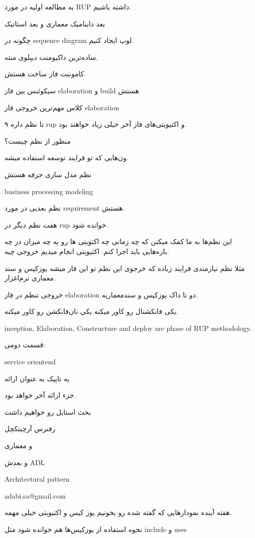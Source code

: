 یه مطالعه اولیه در مورد RUP داشته باشیم.

بعد داینامیک معماری و بعد استاتیک

چگونه در sequence diagram لوپ ایجاد کنیم.

ساده‌ترین داکیومنت دیپلوی منته.

کاموننت فاز ساخت هستش.

سیکوئنس بین فاز elaboration و build هستش

کلاس مهم‌ترین خروجی فاز elaboration


۹ تا نظم داره rup و اکتیویتی‌های فاز آخر خیلی زیاد خواهند بود.

منظور از نظم چیست؟

ون‌هایی که تو فرایند توسعه استفاده میشه.

نظم مدل سازی حرفه هستش

business processing modeling

نظم بعدیی در مورد requirement هستش.

هفت نظم دیگر در rup خوانده شود.

این نظم‌ها به ما کمک میکنن که چه زمانی چه اکتویتی ها رو به چه میزان در چه
بازه‌هایی باید اجرا کنم. اکتیویتی انجام میدیم خروجی چیه.

مثلا نظم نیازمندی فرایند زیاده که خرجوی این نظم تو این فاز میشه یوزکیس و سند
معماری نرم‌اغزار. 

خروجی تنظم در فاز elaboration دو تا داک یوزکیس و سندمعماریه.

یکی فانکشنال رو کاور میکنه یکی نان‌فانکشن رو کاور میکنه.

inception, Elaboration, Constructure and deploy are phase of RUP methodology.

قسمت دومی:

service orientend

یه تاپیک به عنوان ارائه

جزء ارائه آخر خواهد بود.

بحث استایل رو خواهیم داشت

رفنرس آرچیتکچل

و معماری

و بعدش ADL

Architectural pattern

adabi.sa@gmail.com

هفته آینده نمودار‌هایی که گفته شده رو بخونیم یوز کیس و اکتیویتی خیلی مهمه.

نحوه استفاده از یوزکیس‌ها هم خوانده شود مثل include و uses

